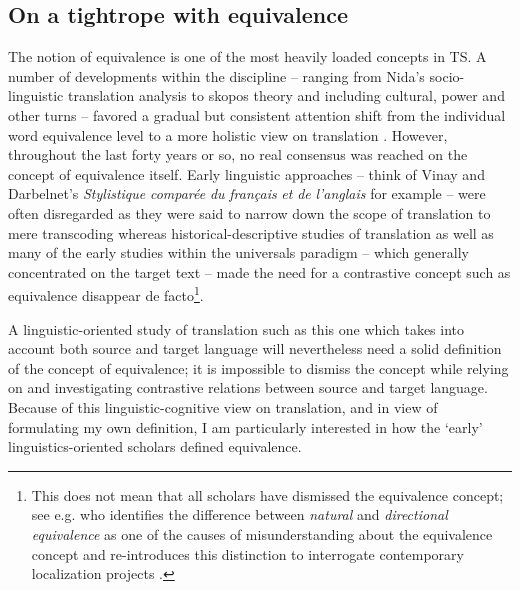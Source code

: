 \subsection{On a tightrope with equivalence}
\label{sec:2.2.4}  
The notion of equivalence is one of the most heavily loaded concepts in TS. A number of developments within the discipline – ranging from Nida’s socio-linguistic translation analysis \citep{nida_toward_1964,nida_theory_1969} to skopos theory \citep{nord_translating_1997} and including cultural, power and other turns – favored a gradual but consistent attention shift from the individual word equivalence level to a more holistic view on translation \citep[10]{munday_issues_2009}. However, throughout the last forty years or so, no real consensus was reached on the concept of equivalence itself. Early linguistic approaches – think of Vinay and Darbelnet’s \textit{Stylistique} \textit{comparée} \textit{du} \textit{français} \textit{et} \textit{de} \textit{l’anglais} \citep{vinay_stylistique_1958} for example – were often disregarded as they were said to narrow down the scope of translation to mere transcoding \citep[1]{vandeweghe_introduction:_2007} whereas historical-descriptive studies of translation as well as many of the early studies within the universals paradigm – which generally concentrated on the target text – made the need for a contrastive concept such as equivalence disappear de facto\footnote{This does not mean that all scholars have dismissed the equivalence concept; see e.g. \citet{pym_natural_2007} who identifies the difference between \textit{natural} and \textit{directional equivalence} as one of the causes of misunderstanding about the equivalence concept and re-introduces this distinction to interrogate contemporary localization projects \citep[271]{pym_natural_2007}.}.

A linguistic-oriented study of translation such as this one which takes into account both source and target language will nevertheless need a solid definition of the concept of equivalence; it is impossible to dismiss the concept while relying on and investigating contrastive relations between source and target language. Because of this linguistic-cognitive view on translation, and in view of formulating my own definition, I am particularly interested in how the ‘early’ linguistics-oriented scholars defined equivalence.


